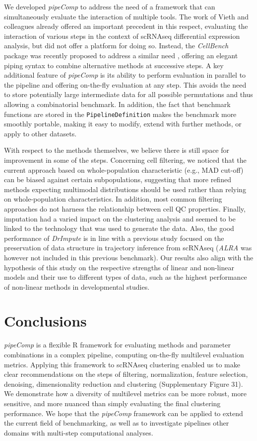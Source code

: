 \documentclass{bmcart}
\begin{document}
We developed \textit{pipeComp} to address the need of a framework that can simultaneously evaluate the interaction of multiple tools. The work of Vieth and colleagues\cite{viethSystematic2019} already offered an important precedent in this respect, evaluating the interaction of various steps in the context of scRNAseq differential expression analysis, but did not offer a platform for doing so. Instead, the \textit{CellBench} package was recently proposed to address a similar need \cite{suCellbench}, offering an elegant piping syntax to combine alternative methods at successive steps. A key additional feature of \textit{pipeComp} is its ability to perform evaluation in parallel to the pipeline and offering on-the-fly evaluation at any step. This avoids the need to store potentially large intermediate data for all possible permutations and thus allowing a combinatorial benchmark. In addition, the fact that benchmark functions are stored in the \texttt{PipelineDefinition} makes the benchmark more smoothly portable, making it easy to modify, extend with further methods, or apply to other datasets.

With respect to the methods themselves, we believe there is still space for improvement in some of the steps. Concerning cell filtering, we noticed that the current approach based on whole-population characteristic (e.g., MAD cut-off) can be biased against certain subpopulations, suggesting that more refined methods expecting multimodal distributions should be used rather than relying on whole-population characteristics. In addition, most common filtering approaches do not harness the relationship between cell QC properties. Finally, imputation had a varied impact on the clustering analysis and seemed to be linked to the technology that was used to generate the data. Also, the good performance of \textit{DrImpute} is in line with a previous study focused on the preservation of data structure in trajectory inference from scRNAseq \cite{ZhangImput2018} (\textit{ALRA} was however not included in this previous benchmark). Our results also align with the hypothesis of this study on the respective strengths of linear and non-linear models and their use to different types of data, such as the highest performance of non-linear methods in developmental studies. 

\section*{Conclusions}

\textit{pipeComp} is a flexible R framework for evaluating methods and parameter combinations in a complex pipeline, computing on-the-fly multilevel evaluation metrics. Applying this framework to scRNAseq clustering enabled us to make clear recommendations on the steps of filtering, normalization, feature selection, denoising, dimensionality reduction and clustering (Supplementary Figure 31). We demonstrate how a diversity of multilevel metrics can be more robust, more sensitive, and more nuanced than simply evaluating the final clustering performance. We hope that the \textit{pipeComp} framework can be applied to extend the current field of benchmarking, as well as to investigate pipelines other domains with multi-step computational analyses.
\end{document}
